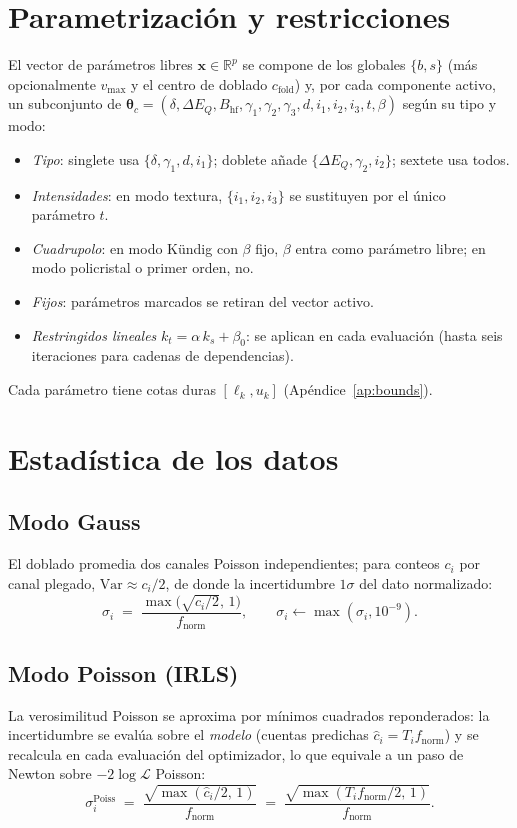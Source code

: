 \documentclass[11pt,a4paper]{article}
\newcommand{\BHF}{B_{\mathrm{hf}}}
\newcommand{\dEQ}{\Delta E_{Q}}
\begin{document}
\section{Parametrización y restricciones}\label{sec:disc-param}

El vector de parámetros libres $\bm x\in\mathbb R^{p}$ se compone de los globales
$\{b,s\}$ (más opcionalmente $v_{\max}$ y el centro de doblado $c_{\text{fold}}$) y,
por cada componente activo, un subconjunto de
$\bm\theta_c=(\delta,\dEQ,\BHF,\gamma_1,\gamma_2,\gamma_3,d,i_1,i_2,i_3,t,\beta)$
según su tipo y modo:
\begin{itemize}[leftmargin=*]
  \item \emph{Tipo}: singlete usa $\{\delta,\gamma_1,d,i_1\}$; doblete añade
        $\{\dEQ,\gamma_2,i_2\}$; sextete usa todos.
  \item \emph{Intensidades}: en modo textura, $\{i_1,i_2,i_3\}$ se sustituyen por
        el único parámetro $t$.
  \item \emph{Cuadrupolo}: en modo Kündig con $\beta$ fijo, $\beta$ entra como
        parámetro libre; en modo policristal o primer orden, no.
  \item \emph{Fijos}: parámetros marcados se retiran del vector activo.
  \item \emph{Restringidos lineales} $k_t=\alpha\,k_s+\beta_0$: se aplican en cada
        evaluación (hasta seis iteraciones para cadenas de dependencias).
\end{itemize}
Cada parámetro tiene cotas duras $[\ell_k,u_k]$ (Apéndice~\ref{ap:bounds}).

\section{Estadística de los datos}\label{sec:weighting}

\subsection{Modo Gauss}
El doblado promedia dos canales Poisson independientes; para conteos $c_i$ por
canal plegado, $\mathrm{Var}\approx c_i/2$, de donde la incertidumbre $1\sigma$
del dato normalizado:
\begin{equation}
  \sigma_i \;=\; \frac{\max\!\bigl(\sqrt{c_i/2},\,1\bigr)}{f_{\text{norm}}},
  \qquad \sigma_i\leftarrow\max(\sigma_i,10^{-9}).
  \label{eq:sigma-gauss}
\end{equation}

\subsection{Modo Poisson (IRLS)}
La verosimilitud Poisson se aproxima por mínimos cuadrados reponderados: la
incertidumbre se evalúa sobre el \emph{modelo} (cuentas predichas
$\hat c_i = T_i f_{\text{norm}}$) y se recalcula en cada evaluación del
optimizador, lo que equivale a un paso de Newton sobre $-2\log\mathcal L$ Poisson:
\begin{equation}
  \sigma_i^{\text{Poiss}} \;=\; \frac{\sqrt{\max(\hat c_i/2,\,1)}}{f_{\text{norm}}}
  \;=\; \frac{\sqrt{\max(T_i f_{\text{norm}}/2,\,1)}}{f_{\text{norm}}}.
  \label{eq:sigma-poisson}
\end{equation}
\end{document}
